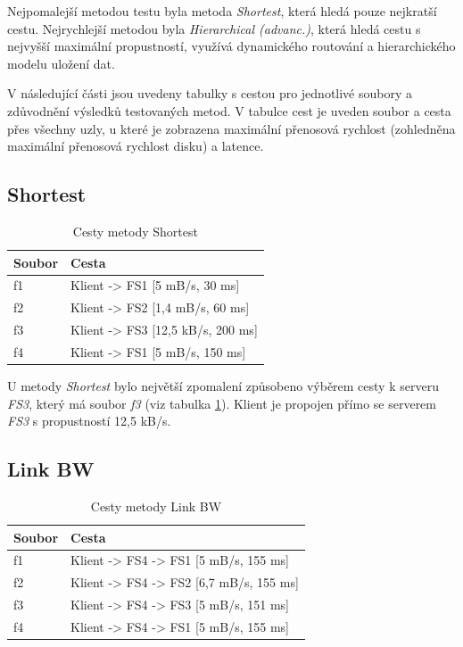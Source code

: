 \documentclass[czech,DP]{thesiskiv}
\begin{document}
Nejpomalejší metodou testu byla metoda \textit{Shortest}, která hledá pouze nejkratší cestu. Nejrychlejší metodou byla \textit{Hierarchical (advanc.)}, která hledá cestu s nejvyšší maximální propustností, využívá dynamického routování a hierarchického modelu uložení dat.

V následující části jsou uvedeny tabulky s cestou pro jednotlivé soubory a zdůvodnění výsledků testovaných metod. V tabulce cest je uveden soubor a cesta přes všechny uzly, u které je zobrazena maximální přenosová rychlost (zohledněna maximální přenosová rychlost disku) a latence.

\subsection{Shortest}
\begin{table}[H]
\centering
\caption{Cesty metody Shortest}
\label{table:test_shortest_routy}
\begin{tabular}{|l|l|}
\hline
\textbf{Soubor} & \textbf{Cesta}           \\ \hline
f1              & Klient -> FS1 [5 mB/s, 30 ms] \\ \hline
f2              & Klient -> FS2 [1,4 mB/s, 60 ms]\\ \hline
f3              & Klient -> FS3 [12,5 kB/s, 200 ms]\\ \hline
f4              & Klient -> FS1 [5 mB/s, 150 ms]\\ \hline
\end{tabular}
\end{table}

U metody \textit{Shortest} bylo největší zpomalení způsobeno výběrem cesty k serveru \textit{FS3}, který má soubor \textit{f3} (viz tabulka \ref{table:test_shortest_routy}). Klient je propojen přímo se serverem \textit{FS3} s propustností 12,5 kB/s. 

\subsection{Link BW}

\begin{table}[H]
\centering
\caption{Cesty metody Link BW}
\label{table:test_linkbw_routy}
\begin{tabular}{|l|l|}
\hline
\textbf{Soubor} & \textbf{Cesta}           \\ \hline
f1              & Klient -> FS4 -> FS1 [5 mB/s, 155 ms]\\ \hline
f2              & Klient -> FS4 -> FS2 [6,7 mB/s, 155 ms]\\ \hline
f3              & Klient -> FS4 -> FS3 [5 mB/s, 151 ms]\\ \hline
f4              & Klient -> FS4 -> FS1 [5 mB/s, 155 ms]\\ \hline
\end{tabular}
\end{table}
\end{document}

